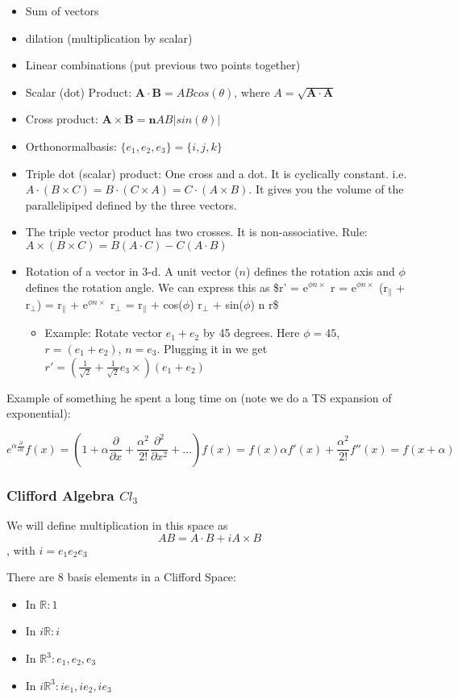 \documentclass[11pt]{article}
\begin{document}
\begin{itemize}
\item Sum of vectors
\item dilation (multiplication by scalar)
\item Linear combinations (put previous two points together)
\item Scalar (dot) Product: $\boldsymbol{A} \cdot \boldsymbol{B} = A B
  cos(\theta)$, where $A = \sqrt{\boldsymbol{A} \cdot \boldsymbol{A}}$
\item Cross product: $\boldsymbol{A} \times \boldsymbol{B} = \boldsymbol{n} A
  B |sin(\theta)|$
\item Orthonormalbasis: $\{e_1, e_2, e_3\} = \{i, j, k\}$
\item Triple dot (scalar) product: One cross and a dot. It is cyclically
  constant. i.e. $A \cdot (B \times C) = B \cdot (C \times A) =C \cdot (A
  \times B)$. It gives you the volume of the parallelipiped defined by the
  three vectors.
\item The triple vector product has two crosses. It is non-associative. Rule: $A
  \times (B \times C) = B(A \cdot C) - C(A \cdot B)$
\item Rotation of a vector in 3-d. A unit vector ($n$) defines the rotation axis
  and $\phi$ defines the rotation angle. We can express this as \$r' = e$^{\phi n
  \times}$ r = e$^{\phi n \times}$ (r$_{\parallel}$ + r$_{\perp}$) = r$_{\parallel}$ +
  e$^{\phi n \times}$ r$_{\perp}$ = r$_{\parallel}$ + cos($\phi$) r$_{\perp}$ + sin($\phi$)
  n \texttimes{} r\$
\begin{itemize}
\item Example: Rotate vector $e_1 + e_2$ by 45 degrees. Here $\phi = 45$, $r =
    (e_1 + e_2)$, $n = e_3$. Plugging it in we get $r' = (\frac{1}{\sqrt{2}} +
    \frac{1}{\sqrt{2}} e_3 \times) (e_1 + e_2)$
\end{itemize}
\end{itemize}

Example of something he spent a long time on (note we do a TS expansion of
exponential):

$$e^{\alpha \frac{\partial}{\partial x}}f(x) = (1 + \alpha
\frac{\partial}{\partial x} + \frac{\alpha^2}{2!} \frac{\partial ^2}{\partial
x^2} + \dots )f(x) = f(x) \alpha f'(x) +\frac{\alpha^2}{2!} f''(x) = f(x +
\alpha)$$
\subsubsection{Clifford Algebra $Cl_3$}
\label{sec-2-2-2}


We will define multiplication in this space as $$AB = A \cdot B + i A \times
B$$, with $i = e_1 e_2 e_3$

There are 8 basis elements in a Clifford Space:
\begin{itemize}
\item In $\mathbb{R}: 1$
\item In $i\mathbb{R}: i$
\item In $\mathbb{R}^3: e_1, e_2, e_3$
\item In $i\mathbb{R}^3: ie_1, ie_2, ie_3$
\end{itemize}
\end{document}
